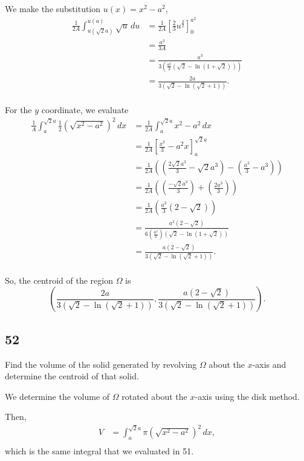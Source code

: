 \documentclass[../hw8]{subfiles}
\begin{document}
We make the substitution $u(x)=x^2-a^2$,
\begin{align*}
    \frac{1}{2A}\int_{u(\sqrt{2}a)}^{u(a)} \sqrt{u}\,du &= \frac{1}{2A}{\left[ \frac{2}{3}u^{\frac{3}{2}} \right]}_{0}^{a^2} \\
    &= \frac{a^3}{3A} \\
    &= \frac{a^3}{3\left( \frac{a^2}{2} \left( \sqrt{2} - \ln{(1+\sqrt{2})} \right) \right)} \\
    &= \frac{2a}{3(\sqrt{2}-\ln{(\sqrt{2}+1)})}. \\
\end{align*}

For the $y$ coordinate, we evaluate
\begin{align*}
    \frac{1}{A}\int_{a}^{\sqrt{2}a}\frac{1}{2}{(\sqrt{x^2-a^2})}^2\,dx &= \frac{1}{2A} \int_{a}^{\sqrt{2}a} x^2-a^2\,dx \\
    &= \frac{1}{2A} {\left[ \frac{x^3}{3}-a^2x \right]}_{a}^{\sqrt{2}a} \\
    &= \frac{1}{2A} \left( \left( \frac{2\sqrt{2}a^3}{3}-\sqrt{2}a^3 \right) - \left( \frac{a^3}{3} - a^3 \right)\right) \\
    &= \frac{1}{2A} \left( \left( \frac{-\sqrt{2}a^3}{3} \right) + \left( \frac{2a^3}{3} \right)\right) \\
    &= \frac{1}{2A} \left( \frac{a^3}{3}(2-\sqrt{2}) \right) \\
    &= \frac{a^3(2-\sqrt{2})}{6\left( \frac{a^2}{2} \right) \left( \sqrt{2} - \ln{(1+\sqrt{2})} \right)} \\
    &= \frac{a(2-\sqrt{2})}{3(\sqrt{2}-\ln{(\sqrt{2}+1)})}. \\
\end{align*}

So, the centroid of the region $\Omega$ is \[\left(\frac{2a}{3(\sqrt{2}-\ln{(\sqrt{2}+1)})}, \frac{a(2-\sqrt{2})}{3(\sqrt{2}-\ln{(\sqrt{2}+1)})} \right).\]


\subsection*{52}
Find the volume of the solid generated by revolving $\Omega$ about the $x$-axis and determine the centroid of that solid.

We determine the volume of $\Omega$ rotated about the $x$-axis using the disk method.

Then,
\begin{align*}
    V &= \int_{a}^{\sqrt{2}a} \pi {\left( \sqrt{x^2-a^2} \right)}^2\,dx, \\
\end{align*}
which is the same integral that we evaluated in 51.
\end{document}
